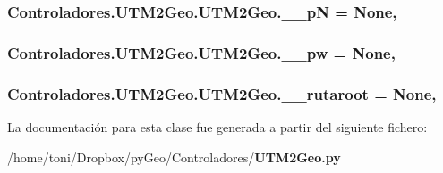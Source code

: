 \subsubsection[{\-\_\-\-\_\-p\-N}]{\setlength{\rightskip}{0pt plus 5cm}Controladores.\-U\-T\-M2\-Geo.\-U\-T\-M2\-Geo.\-\_\-\-\_\-p\-N = None\hspace{0.3cm}{\ttfamily [static]}, {\ttfamily [private]}}\label{classControladores_1_1UTM2Geo_1_1UTM2Geo_a1aec58d4289d754183e01461e0bf3295}
\subsubsection[{\-\_\-\-\_\-pw}]{\setlength{\rightskip}{0pt plus 5cm}Controladores.\-U\-T\-M2\-Geo.\-U\-T\-M2\-Geo.\-\_\-\-\_\-pw = None\hspace{0.3cm}{\ttfamily [static]}, {\ttfamily [private]}}\label{classControladores_1_1UTM2Geo_1_1UTM2Geo_a25c4708d5e8de2525f5430cbf94ad7a9}
\subsubsection[{\-\_\-\-\_\-rutaroot}]{\setlength{\rightskip}{0pt plus 5cm}Controladores.\-U\-T\-M2\-Geo.\-U\-T\-M2\-Geo.\-\_\-\-\_\-rutaroot = None\hspace{0.3cm}{\ttfamily [static]}, {\ttfamily [private]}}\label{classControladores_1_1UTM2Geo_1_1UTM2Geo_a4033261c678a34df0f56f1d1df3bb0b3}


La documentación para esta clase fue generada a partir del siguiente fichero\-:\begin{DoxyCompactItemize}
\item 
/home/toni/\-Dropbox/py\-Geo/\-Controladores/{\bf U\-T\-M2\-Geo.\-py}\end{DoxyCompactItemize}
